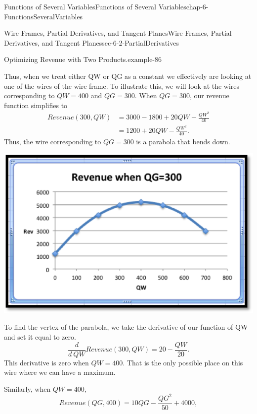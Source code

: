 \documentclass[oneside,10pt,]{book}
\numberwithin{equation}{section}
\newcommand{\amp}{&}
\begin{document}
\begin{chapterptx}{Functions of Several Variables}{}{Functions of Several Variables}{}{}{chap-6-FunctionsSeveralVariables}
\begin{sectionptx}{Wire Frames, Partial Derivatives, and Tangent Planes}{}{Wire Frames, Partial Derivatives, and Tangent Planes}{}{}{sec-6-2-PartialDerivatives}
\begin{example}{Optimizing Revenue with Two Products.}{example-86}
\par
\hypertarget{p-2210}{}%
Thus, when we treat either QW or QG as a constant we effectively are looking at one of the wires of the wire frame.  To illustrate this, we will look at the wires corresponding to \(QW=400\) and \(QG=300\). When \(QG=300\), our revenue function simplifies to%
%
\begin{equation*}
\begin{aligned}  Revenue(300,QW)
\amp =3000-1800+20QW-\frac{QW^2}{40}\\ 
\amp =1200+20QW-\frac{QW^2}{40}.\end{aligned}
\end{equation*}
\hypertarget{p-2211}{}%
Thus, the wire corresponding to \(QG=300\) is a parabola that bends down.%
\begin{sidebyside}{1}{0.25}{0.25}{0}%
\begin{sbspanel}{0.5}%
\includegraphics[width=1\linewidth]{images/sec-6-2-4.png}
\end{sbspanel}%
\end{sidebyside}%
\par
\hypertarget{p-2212}{}%
To find the vertex of the parabola, we take the derivative of our function of QW and set it equal to zero.%
%
\begin{equation*}
\frac{d}{d\ QW} Revenue(300,QW)=20-\frac{QW}{20}.
\end{equation*}
\hypertarget{p-2213}{}%
This derivative is zero when \(QW=400\).  That is the only possible place on this wire where we can have a maximum.%
\par
\hypertarget{p-2214}{}%
Similarly, when \(QW=400\),%
%
\begin{equation*}
Revenue(QG,400)=10QG-\frac{QG^2}{50}+4000,
\end{equation*}

\end{example}
\end{sectionptx}
\end{chapterptx}
\end{document}
